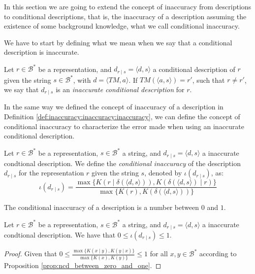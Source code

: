{\color{red}

In this section we are going to extend the concept of inaccuracy from descriptions to conditional descriptions, that is, the inaccuracy of a description assuming the existence of some background knowledge, what we call conditional inaccuracy.

We have to start by defining what we mean when we say that a conditional description is inaccurate.

\begin{definition}
Let $r \in \mathcal{B}^\ast$ be a representation, and $d_{r \mid s} = \langle d, s \rangle$ a conditional description of $r$ given the string $s \in \mathcal{B}^\ast$, with $ d = \langle TM, a \rangle$. If $TM \left(\langle a, s \rangle \right) = r'$, such that $r \neq r'$, we say that $d_{r \mid s}$ is an \emph{inaccurate conditional description} for $r$.
\end{definition}

In the same way we defined the concept of inaccuracy of a description in Definition \ref{def:inaccuracy:inaccuracy:inaccuracy}, we can define the concept of conditional inaccuracy to characterize the error made when using an inaccurate conditional description.

\begin{definition}
Let $r \in \mathcal{B}^\ast$ be a representation, $s \in \mathcal{B}^\ast$ a string, and $d_{r \mid s} = \langle d, s \rangle$ a inaccurate condtional description. We define the \emph{conditional inaccuracy} of the description $d_{r \mid s}$ for the representation $r$ given the string $s$, denoted by $\iota(d_{r \mid s})$, as:
\[
\iota(d_{r \mid s}) = \frac{ \max\{ K \left(r \mid \delta(\langle d, s \rangle) \right), K \left( \delta(\langle d, s \rangle) \mid r \right) \} } { \max\{ K(r), K \left(\delta(\langle d, s \rangle) \right) \} }
\]
\end{definition}

The conditional inaccuracy of a description is a number between $0$ and $1$.

\begin{proposition}
\label{prop:range_conditional_inaccuracy}
Let $r \in \mathcal{B}^\ast$ be a representation, $s \in \mathcal{B}^\ast$ a string, and $d_{r \mid s} = \langle d, s \rangle$ a inaccurate condtional description. We have that $0 \leq \iota(d_{r \mid s}) \leq 1$.
\end{proposition}
\begin{proof}
Given that $0 \leq \frac{ \max\{ K(x \mid y), K(y \mid x) \} } { \max\{ K(x), K(y) \} } \leq 1$ for all $x, y \in \mathcal{B}^\ast$ according to Proposition \ref{prop:ncd_between_zero_and_one}.
\end{proof}

}
